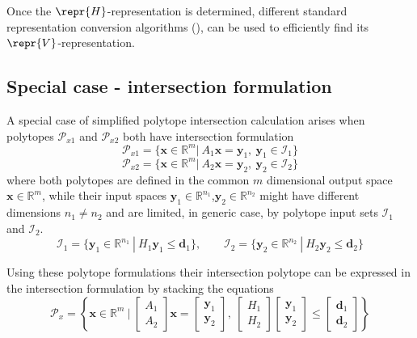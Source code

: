 Once the $\repr{H}$-representation is determined, different standard representation conversion algorithms (), can be used to efficiently find its $\repr{V}$-representation.

\subsection{Special case - intersection formulation}

A special case of simplified polytope intersection calculation arises when polytopes $\mathcal{P}_{x1}$ and $\mathcal{P}_{x2}$ both have intersection formulation
\begin{equation}
    \mathcal{P}_{x1}=\{\bm{x}\in\mathbb{R}^m |~ A_1\bm{x} = \bm{y}_1,~\bm{y}_1 \in \mathcal{I}_1  \}
\end{equation}
\begin{equation}
    \mathcal{P}_{x2}=\{\bm{x}\in\mathbb{R}^m |~ A_2\bm{x} = \bm{y}_2,~\bm{y}_2 \in \mathcal{I}_2  \}
\end{equation}
where both polytopes are defined in the common $m$ dimensional output space $\bm{x}\in\mathbb{R}^m$, while their input spaces $\bm{y}_1\in\mathbb{R}^{n_1}$,$\bm{y}_2\in\mathbb{R}^{n_2}$ might have different dimensions $n_1\neq n_2$ and are limited, in generic case, by polytope input sets $\mathcal{I}_1$ and $\mathcal{I}_2$.
\begin{equation}
    \mathcal{I}_{1}=\{\bm{y}_1\in\mathbb{R}^{n_1} ~|~ H_1\bm{y}_1 \leq \bm{d}_1\}, \qquad
    \mathcal{I}_{2}=\{\bm{y}_2\in\mathbb{R}^{n_2} ~|~ H_2\bm{y}_2 \leq \bm{d}_2\}
\end{equation}

Using these polytope formulations their intersection polytope can be expressed in the intersection formulation by stacking the equations
\begin{equation}
    \mathcal{P}_{x}=\left\{\bm{x}\in\mathbb{R}^m ~\bigg|~ 
   \begin{bmatrix}
        A_1 \\
        A_2
    \end{bmatrix} \bm{x} = \begin{bmatrix}
        \bm{y}_1 \\
        \bm{y}_2
    \end{bmatrix}, ~\begin{bmatrix}
        H_1  \\
        H_2
    \end{bmatrix} \begin{bmatrix}
        \bm{y}_1 \\
        \bm{y}_2
    \end{bmatrix} \leq \begin{bmatrix}
        \bm{d}_1  \\
        \bm{d}_2
    \end{bmatrix} \right\}
\end{equation}


